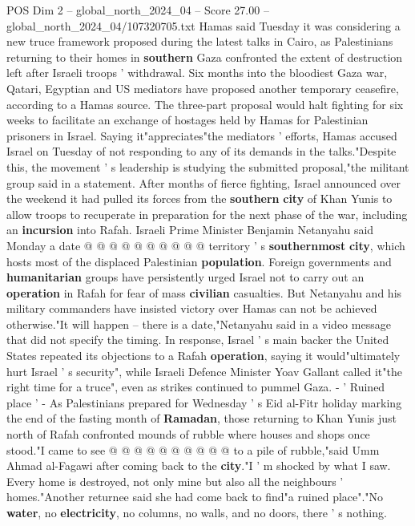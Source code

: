 \begin{textsample}{POS Dim 2 – global\_north\_2024\_04 – Score 27.00 – global\_north\_2024\_04/107320705.txt}  \label{ex:f2_pos_268}
Hamas said Tuesday it was considering a new truce framework proposed during the latest talks in Cairo, as Palestinians returning to their homes in \textbf{southern} Gaza confronted the extent of destruction left after Israeli troops ' withdrawal.
Six months into the bloodiest Gaza war, Qatari, Egyptian and US mediators have proposed another temporary ceasefire, according to a Hamas source.
The three-part proposal would halt fighting for six weeks to facilitate an exchange of hostages held by Hamas for Palestinian prisoners in Israel.
Saying it"appreciates"the mediators ' efforts, Hamas accused Israel on Tuesday of not responding to any of its demands in the talks."Despite this, the movement ' s leadership is studying the submitted proposal,"the militant group said in a statement.
After months of fierce fighting, Israel announced over the weekend it had pulled its forces from the \textbf{southern} \textbf{city} of Khan Yunis to allow troops to recuperate in preparation for the next phase of the war, including an \textbf{incursion} into Rafah.
Israeli Prime Minister Benjamin Netanyahu said Monday a date @ @ @ @ @ @ @ @ @ @ territory ' s \textbf{southernmost} \textbf{city}, which hosts most of the displaced Palestinian \textbf{population}.
Foreign governments and \textbf{humanitarian} groups have persistently urged Israel not to carry out an \textbf{operation} in Rafah for fear of mass \textbf{civilian} casualties.
But Netanyahu and his military commanders have insisted victory over Hamas can not be achieved otherwise."It will happen -- there is a date,"Netanyahu said in a video message that did not specify the timing.
In response, Israel ' s main backer the United States repeated its objections to a Rafah \textbf{operation}, saying it would"ultimately hurt Israel ' s security", while Israeli Defence Minister Yoav Gallant called it"the right time for a truce", even as strikes continued to pummel Gaza. - ' Ruined place ' - As Palestinians prepared for Wednesday ' s Eid al-Fitr holiday marking the end of the fasting month of \textbf{Ramadan}, those returning to Khan Yunis just north of Rafah confronted mounds of rubble where houses and shops once stood."I came to see @ @ @ @ @ @ @ @ @ @ to a pile of rubble,"said Umm Ahmad al-Fagawi after coming back to the \textbf{city}."I ' m shocked by what I saw.
Every home is destroyed, not only mine but also all the neighbours ' homes."Another returnee said she had come back to find"a ruined place"."No \textbf{water}, no \textbf{electricity}, no columns, no walls, and no doors, there ' s nothing.

\end{textsample}
